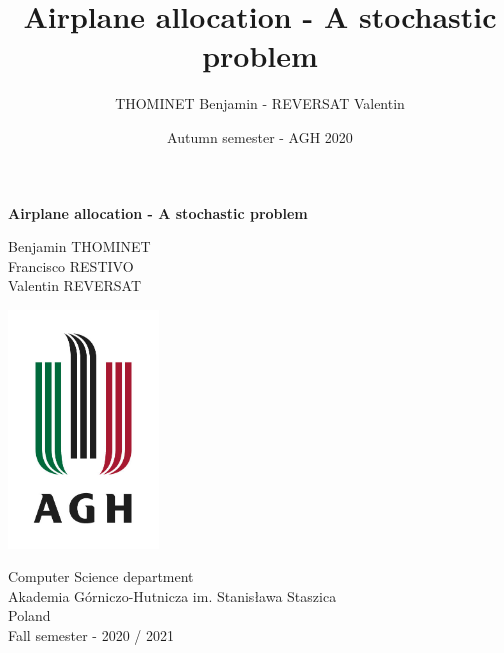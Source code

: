 \documentclass[11pt]{article}
\title{Airplane allocation - A stochastic problem}
\author{THOMINET Benjamin - REVERSAT Valentin}
\date{Autumn semester - AGH 2020}
\begin{document}
\graphicspath{{images/}}
    

\begin{titlepage}
    \begin{center}
        \vspace*{1cm}
            
        \Huge
        \textbf{Airplane allocation - A stochastic problem}
            
        \vspace{1cm}
            
        \vfill
        \Large
        Benjamin THOMINET \\ 
        Francisco RESTIVO \\
        Valentin REVERSAT
            
        \vspace{0.8cm}
            
        \includegraphics[width=0.3\textwidth]{images/agh.jpg}
            
        \Large
        Computer Science department\\
        Akademia Górniczo-Hutnicza im. Stanisława Staszica\\
        Poland\\
        Fall semester - 2020 / 2021
            
    \end{center}
\end{titlepage}
    
\pagebreak

\tableofcontents

\pagebreak
    
    

    
\end{document}
